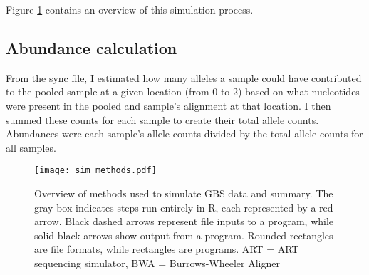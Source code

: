 Figure \ref{fig:methods_overview} contains an overview of this simulation process.


\subsection{Abundance calculation}

From the sync file, I estimated how many alleles a sample could have contributed to
the pooled sample at a given location (from 0 to 2) based on what nucleotides
were present in the pooled and sample's alignment at that location.
I then summed these counts for each sample to create their total allele counts.
Abundances were each sample's allele counts divided by the total allele counts for all
samples.



\begin{figure}[!ht]
    \centering
    \texttt{[image: sim\_methods.pdf]}
    \caption{Overview of methods used to simulate GBS data and summary. The gray box
        indicates steps run entirely in R, each represented by a red arrow.
        Black dashed arrows represent file inputs to a program, while solid black arrows
        show output from a program.
        Rounded rectangles are file formats, while rectangles are programs.
        ART = ART sequencing simulator, BWA = Burrows-Wheeler Aligner
        }
    \label{fig:methods_overview}
\end{figure}

\clearpage